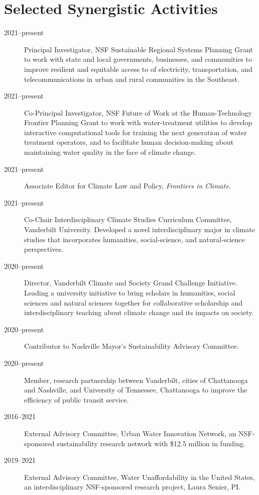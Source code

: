 \documentclass[10pt]{article}
\begin{document}
 \section{Selected Synergistic Activities}
 \begin{description}
   \item [2021--present] Principal Investigator, NSF Sustainable Regional
   Systems Planning Grant to work with state and local
   governments, businesses, and communities to improve resilient and
   equitable access to
   of electricity, transportation, and telecommunications in urban and rural communities in the Southeast.
   \item [2021--present] Co-Principal Investigator, NSF Future of Work at the
   Human-Technology Frontier Planning Grant to work with water-treatment
   utilities to develop interactive computational tools for training the
   next generation of water treatment operators, and to facilitate human
   decision-making about maintaining water quality in the face of
   climate change.
   \item [2021--present] Associate Editor for Climate Law and Policy,
\emph{Frontiers in Climate}.
   \item[2021--present] Co-Chair Interdisciplinary Climate Studies
   Curriculum Committee, Vanderbilt University. Developed a novel
   interdisciplinary major in climate studies that incorporates humanities,
   social-science, and natural-science perspectives.
   \item[2020--present] Director, Vanderbilt Climate and Society Grand
     Challenge Initiative.
     Leading a university initiative to bring scholars in humanities, social
     sciences and natural sciences together for collaborative scholarship and
     interdisciplinary teaching about climate change and its impacts on
     society.
  \item[2020--present] Contributor to Nashville Mayor's Sustainability Advisory
    Committee.
   \item [2020--present] Member, research partnership between Vanderbilt,
cities of Chattanooga and Nashville, and University of Tennessee, Chattanooga to improve the efficiency of public transit service.
   \item[2016--2021] External Advisory Committee,
     Urban Water Innovation Network, an NSF-sponsored sustainability research
     network with \$12.5 million in funding.
    \item [2019--2021] External Advisory Committee,
    Water Unaffordability in the United States, an interdisciplinary NSF-sponsored research project, Laura Senier, PI.

\end{description}
\end{document}
